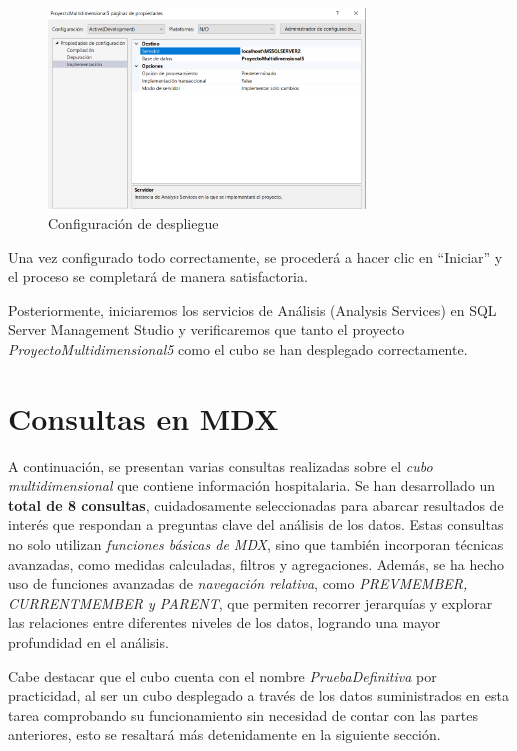 \documentclass[12pt, a4paper, twoside]{article}
\begin{document}
	 \begin{figure}[H]
	 	\centering
	 	\includegraphics[width=0.75\textwidth]{image/despliegue}
	 	\caption{Configuración de despliegue}
	 	\label{fig:3}
	 \end{figure}
	 
	 Una vez configurado todo correctamente, se procederá a hacer clic en ``Iniciar'' y el proceso se completará de manera satisfactoria. 
	 
	Posteriormente, iniciaremos los servicios de Análisis (Analysis Services) en SQL Server Management Studio y verificaremos que tanto el proyecto \textit{ProyectoMultidimensional5} como el cubo se han desplegado correctamente.
	
	 
	
	\section{Consultas en MDX}
	
	A continuación, se presentan varias consultas realizadas sobre el \textit{cubo multidimensional} que contiene información hospitalaria. Se han desarrollado un \textbf{total de 8 consultas}, cuidadosamente seleccionadas para abarcar resultados de interés que respondan a preguntas clave del análisis de los datos. Estas consultas no solo utilizan \textit{funciones básicas de  MDX}, sino que también incorporan técnicas avanzadas, como medidas calculadas, filtros y agregaciones. Además, se ha hecho uso de funciones avanzadas de \textit{navegación relativa}, como \textit{PREVMEMBER, CURRENTMEMBER y PARENT}, que permiten recorrer jerarquías y explorar las relaciones entre diferentes niveles de los datos, logrando una mayor profundidad en el análisis.
	
	Cabe destacar que el cubo cuenta con el nombre \textit{PruebaDefinitiva} por practicidad, al ser un cubo desplegado a través de los datos suministrados en esta tarea comprobando su funcionamiento sin necesidad de contar con las partes anteriores, esto se resaltará más detenidamente en la siguiente sección.
	
\end{document}
